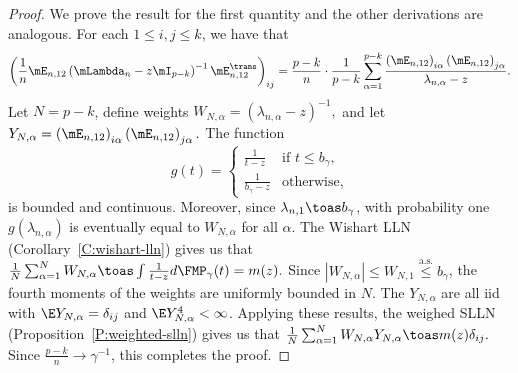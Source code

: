 \begin{proof}
We prove the result for the first quantity and the other derivations are analogous.  For each $1 \leq i, j \leq k$, we have that
\begin{align*}
    \left(
        \frac{1}{n}
        \mE_{n,12}
        \left(
            \mLambda_n
            -
            z \mI_{p-k}
        \right)^{-1}
        \mE_{n,12}^\trans    
    \right)_{ij}
    =
    \frac{p-k}{n}
    \cdot
    \frac{1}{p-k}
    \sum_{\alpha=1}^{p-k}
        \frac{ \left( \mE_{n,12} \right)_{i\alpha}
               \left( \mE_{n,12} \right)_{j\alpha}
             }
             { \lambda_{n,\alpha} - z }.
\end{align*}
Let $N = p-k$, define weights 
\(
    W_{N,\alpha} = (\lambda_{n,\alpha} - z)^{-1},
\)
and let
\(
    Y_{N,\alpha} = \left( \mE_{n,12} \right)_{i\alpha}
                   \left( \mE_{n,12} \right)_{j\alpha}.
\)
The function
\[
    g(t) 
    = 
    \begin{cases}
        \frac{1}{t - z} 
            &\text{if $t \leq b_\gamma$,} \\
        \frac{1}{b_\gamma - z}
            &\text{otherwise,}
    \end{cases}
\]
is bounded and continuous.  Moreover, since $\lambda_{n,1} \toas b_\gamma$, with probability one $g(\lambda_{n,\alpha})$ is eventually equal to $W_{N,\alpha}$ for all $\alpha$.  The Wishart LLN (Corollary~\ref{C:wishart-lln}) gives us that
\(
    \frac{1}{N}
    \sum_{\alpha=1}^N W_{N,\alpha}
        \toas
            \int
                \frac{1}{t - z} d\FMP_\gamma(t) = m(z).
\)
Since $| W_{N,\alpha} | \leq W_{N,1} \overset{\text{a.s.}}{\leq} b_\gamma$, the fourth moments of the weights are uniformly bounded in $N$.  
The $Y_{N,\alpha}$ are all iid with $\E Y_{N,\alpha} = \delta_{ij}$ and $\E Y_{N,\alpha}^4 < \infty$.  
Applying these results, the weighed SLLN (Proposition~\ref{P:weighted-slln}) gives us that
\(
    \frac{1}{N}
    \sum_{\alpha=1}^N
        W_{N,\alpha}
        Y_{N,\alpha}
    \toas
        m(z)
        \delta_{ij}.
\)
Since $\frac{p-k}{n} \to \gamma^{-1}$, this completes the proof.
\end{proof}


